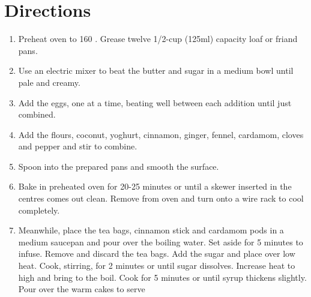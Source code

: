 \section*{Directions}
\begin{enumerate}
	\item Preheat oven to 160 \textcelsius . Grease twelve 1/2-cup (125ml) capacity loaf or friand pans.
	\item Use an electric mixer to beat the butter and sugar in a medium bowl until pale and creamy.
	\item Add the eggs, one at a time, beating well between each addition until just combined.
	\item Add the flours, coconut, yoghurt, cinnamon, ginger, fennel, cardamom, cloves and pepper and stir to combine.
	\item Spoon into the prepared pans and smooth the surface.
	\item Bake in preheated oven for 20-25 minutes or until a skewer inserted in the centres comes out clean.
		Remove from oven and turn onto a wire rack to cool completely.
	\item Meanwhile, place the tea bags, cinnamon stick and cardamom pods in a medium saucepan and pour over the boiling water.
		Set aside for 5 minutes to infuse. Remove and discard the tea bags. Add the sugar and place over low heat.
		Cook, stirring, for 2 minutes or until sugar dissolves. Increase heat to high and bring to the boil.
		Cook for 5 minutes or until syrup thickens slightly. Pour over the warm cakes to serve
\end{enumerate}

